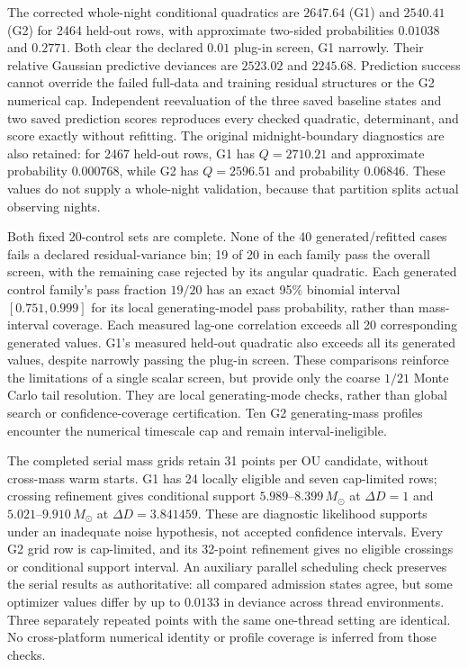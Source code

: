 The corrected whole-night conditional quadratics are $2647.64$ (G1) and
$2540.41$ (G2) for 2464 held-out rows, with approximate two-sided probabilities
$0.01038$ and $0.2771$. Both clear the declared $0.01$ plug-in screen, G1 narrowly.
Their relative Gaussian predictive deviances are $2523.02$ and $2245.68$.
Prediction success cannot override the failed full-data and training residual
structures or the G2 numerical cap. Independent reevaluation of the three saved
baseline states and two saved prediction scores reproduces every checked
quadratic, determinant, and score exactly without refitting.
The original midnight-boundary diagnostics are also retained: for 2467 held-out
rows, G1 has $Q=2710.21$ and approximate probability $0.000768$, while G2 has
$Q=2596.51$ and probability $0.06846$. These values do not supply a whole-night
validation, because that partition splits actual observing nights.

Both fixed 20-control sets are complete. None of the 40 generated/refitted cases
fails a declared residual-variance bin; 19 of 20 in each family pass the overall
screen, with the remaining case rejected by its angular quadratic. Each generated
control family's pass fraction $19/20$ has an exact 95\% binomial interval $[0.751,0.999]$ for
its local generating-model pass probability, rather than mass-interval coverage.
Each measured
lag-one correlation exceeds all 20 corresponding generated values. G1's measured
held-out quadratic also exceeds all its generated values, despite narrowly
passing the plug-in screen. These comparisons reinforce the limitations of a
single scalar screen, but provide only the coarse $1/21$ Monte Carlo tail
resolution. They are local generating-mode checks, rather than global search
or confidence-coverage certification. Ten G2 generating-mass profiles encounter
the numerical timescale cap and remain interval-ineligible.

The completed serial mass grids retain 31 points per OU candidate, without
cross-mass warm starts. G1 has 24 locally eligible and seven cap-limited rows;
crossing refinement gives conditional support $5.989$--$8.399\,M_\odot$ at
$\Delta D=1$ and $5.021$--$9.910\,M_\odot$ at $\Delta D=3.841459$.
These are diagnostic likelihood supports under an inadequate noise hypothesis,
not accepted confidence intervals. Every G2 grid row is cap-limited, and its
32-point refinement gives no eligible crossings or conditional support interval.
An auxiliary parallel scheduling check preserves
the serial results as authoritative: all compared admission states agree, but
some optimizer values differ by up to $0.0133$ in deviance across thread
environments. Three separately repeated points with the same one-thread setting
are identical. No cross-platform numerical identity or profile coverage is
inferred from those checks.

